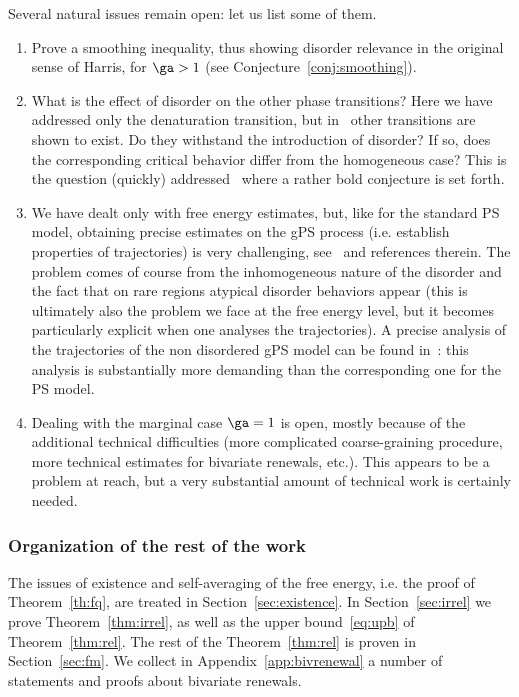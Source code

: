 Several natural issues remain open: let us list some of them.
\begin{enumerate}
\item Prove a smoothing inequality, thus showing disorder relevance in the original sense of Harris, for $\ga>1$ (see Conjecture~\ref{conj:smoothing}).
\item What is the effect of disorder on the other phase transitions? Here we have addressed only the denaturation transition, but in~\cite{cf:GK} other transitions are shown to exist. Do they withstand the introduction of disorder? If so, does the corresponding critical behavior differ from the homogeneous case? This is the question (quickly) addressed~\cite{cf:NG06} where a rather bold conjecture is set forth.
\item We have dealt only with free energy estimates, but, like for the standard PS model, obtaining precise estimates on the gPS process (i.e. establish properties of trajectories) is very challenging, see~\cite[Chapter~8]{cf:G} and references therein. The problem comes of course from the inhomogeneous nature of the disorder and the fact that on rare regions atypical disorder behaviors appear (this is ultimately also the problem we face at the free energy level, but it becomes particularly explicit when one analyses the trajectories). A precise analysis of the trajectories of the non disordered gPS model can be found in~\cite{cf:BGK}: this analysis is substantially more demanding than the corresponding one for the PS model.
\item Dealing with the marginal case $\ga=1$ is open, mostly because of the additional technical difficulties (more complicated coarse-graining procedure, more technical estimates for bivariate renewals, etc.). This appears to be a problem at reach, but a very substantial amount of technical work is certainly needed.
\end{enumerate}

\subsubsection{Organization of the rest of the work}

The issues of existence and self-averaging of the free energy, i.e. the proof of Theorem~\ref{th:fq}, are treated in Section~\ref{sec:existence}. In Section~\ref{sec:irrel} we prove Theorem~\ref{thm:irrel}, as well as the upper bound~\eqref{eq:upb} of Theorem~\ref{thm:rel}. The rest of the Theorem~\ref{thm:rel} is proven in Section~\ref{sec:fm}. We collect in Appendix~\ref{app:bivrenewal} a number of statements and proofs about bivariate renewals.

